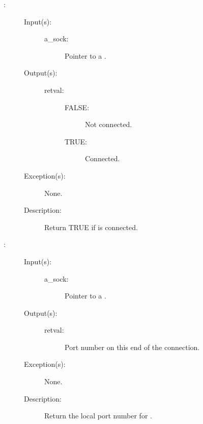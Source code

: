 \begin{description}
\item[{}: ]
	\begin{description}\item[]
	\item[Input(s): ]
		\begin{description}\item[]
		\item[a\_sock: ]
			Pointer to a .
		\end{description}
	\item[Output(s): ]
		\begin{description}\item[]
		\item[retval: ]
			\begin{description}\item[]
			\item[FALSE: ]
				Not connected.
			\item[TRUE: ]
				Connected.
			\end{description}
		\end{description}
	\item[Exception(s): ] None.
	\item[Description: ]
		Return TRUE if  is connected.
	\end{description}
\label{sock_port_get}
\item[{}: ]
	\begin{description}\item[]
	\item[Input(s): ]
		\begin{description}\item[]
		\item[a\_sock: ]
			Pointer to a .
		\end{description}
	\item[Output(s): ]
		\begin{description}\item[]
		\item[retval: ]
			Port number on this end of the connection.
		\end{description}
	\item[Exception(s): ] None.
	\item[Description: ]
		Return the local port number for .
	\end{description}
\label{sock_connect}

\end{description}
